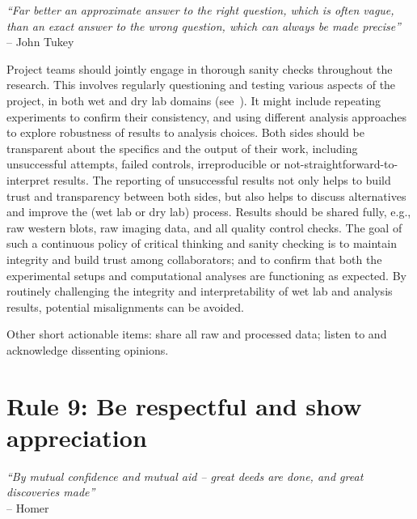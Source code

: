 \documentclass{article}
\begin{document}
\begin{flushright}
\rightskip=1cm\textit{``Far better an approximate answer to the right question, which is often vague, than an exact answer to the wrong question, which can always be made precise''} \\
\vspace{.2em}
\rightskip=0cm -- John Tukey
\end{flushright}

Project teams should jointly engage in thorough sanity checks throughout the research. This involves regularly questioning and testing various aspects of the project, in both wet and dry lab domains (see~). It might include repeating experiments to confirm their consistency, and using different analysis approaches to explore robustness of results to analysis choices. Both sides should be transparent about the specifics and the output of their work, including unsuccessful attempts, failed controls, irreproducible or not-straightforward-to-interpret results. The reporting of unsuccessful results not only helps to build trust and transparency between both sides, but also helps to discuss alternatives and improve the (wet lab or dry lab) process. Results should be shared fully, e.g., raw western blots, raw imaging data, and all quality control checks. The goal of such a continuous policy of critical thinking and sanity checking is to maintain integrity and build trust among collaborators; and to confirm that both the experimental setups and computational analyses are functioning as expected. By routinely challenging the integrity and interpretability of wet lab and analysis results, potential misalignments can be avoided.

Other short actionable items: share all raw and processed data; listen to and acknowledge dissenting opinions.

\section*{Rule 9: Be respectful and show appreciation} %
\label{rule9_respect}

\begin{flushright}
\rightskip=1cm\textit{``By mutual confidence and mutual aid – great deeds are done, and great discoveries made''} \\
\vspace{.2em}
\rightskip=0cm -- Homer
\end{flushright}
\end{document}
